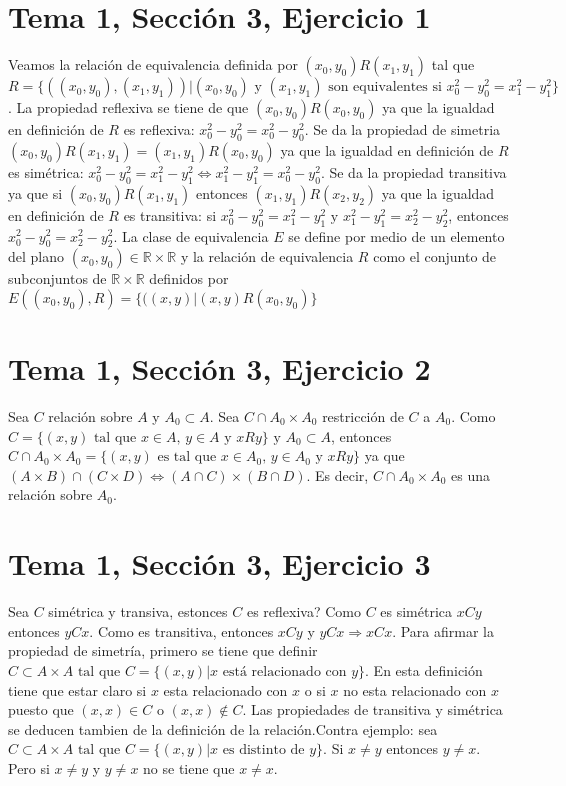 \documentclass{article}
\begin{document}
\section{Tema 1, Sección 3, Ejercicio 1}

Veamos la relación de equivalencia definida por \((x_0,y_0)R(x_1,y_1)\) tal que
\(R=\{((x_0,y_0),(x_1,y_1))| (x_0,y_0) \text{ y } (x_1,y_1) \text{ son equivalentes si } x^{2}_{0}-y^{2}_{0}=x^{2}_{1}-y^{2}_{1} \}\). La propiedad reflexiva se tiene de que \((x_0,y_0)R(x_0,y_0)\) ya que la igualdad en definición de \(R\) es reflexiva: \( x^{2}_{0}-y^{2}_{0}=x^{2}_{0}-y^{2}_{0} \). Se da la propiedad de simetria \((x_0,y_0)R(x_1,y_1)=(x_1,y_1)R(x_0,y_0)\) ya que la igualdad en definición de \(R\) es simétrica: \( x^{2}_{0}-y^{2}_{0}=x^{2}_{1}-y^{2}_{1} \Leftrightarrow  x^{2}_{1}-y^{2}_{1}=x^{2}_{0}-y^{2}_{0} \). Se da la propiedad transitiva ya que si \((x_0,y_0)R(x_1,y_1)\) entonces \((x_1,y_1)R(x_2,y_2)\) ya que la igualdad en definición de \(R\) es transitiva: si \( x^{2}_{0}-y^{2}_{0}=x^{2}_{1}-y^{2}_{1} \text{ y } x^{2}_{1}-y^{2}_{1}=x^{2}_{2}-y^{2}_{2} \), entonces \( x^{2}_{0}-y^{2}_{0}=x^{2}_{2}-y^{2}_{2} \).
\newline
La clase de equivalencia \(E\) se define por medio de un elemento del plano \((x_0,y_0) \in \mathbb{R} \times \mathbb{R}\) y la relación de equivalencia \(R\) como el conjunto de subconjuntos de \(\mathbb{R} \times \mathbb{R}\) definidos por \(E((x_0,y_0),R)=\{((x,y)|(x,y)R(x_0,y_0)\}\)

\section{Tema 1, Sección 3, Ejercicio 2}
Sea \(C\) relación sobre \(A\) y \(A_0 \subset A\). Sea \(C\cap A_0 \times A_0\) restricción de \(C\) a \(A_0\). Como \(C=\{(x,y)\text{ tal que } x\in A \text{, } y \in A \text{ y } xRy\} \text{ y } A_0 \subset A\), entonces \(C\cap A_0 \times A_0 =\{(x,y) \text{ es tal que } x\in A_0 \text{, } y \in A_0 \text{ y } xRy\}\) ya que \((A\times B)\cap(C\times D)\Leftrightarrow (A \cap C)\times (B \cap D)\). Es decir, \(C\cap A_0 \times A_0\)  es una relación sobre \(A_0\).
\section{Tema 1, Sección 3, Ejercicio 3}
Sea \(C\) simétrica y transiva, estonces \(C\) es reflexiva?
Como \(C\) es simétrica \(xCy\) entonces \(yCx\). Como es transitiva, entonces \(xCy\) y \(yCx\Rightarrow xCx\). Para afirmar la propiedad de simetría, primero se tiene que definir \(C \subset A\times A \text{ tal que } C = \{(x,y)| x \text{ está relacionado con } y\}\). En esta definición tiene que estar claro si \(x\) esta relacionado con \(x\) o si \(x\) no esta relacionado con \(x\)  puesto que \((x,x)\in C\) o  \((x,x)\notin C\). Las propiedades de transitiva y simétrica se deducen tambien de la definición de la relación.Contra ejemplo: sea  \(C \subset A\times A \text{ tal que } C = \{(x,y)| x \text{ es distinto de } y\}\). Si \(x\neq y\) entonces \(y\neq x\). Pero si  \(x\neq y\) y \(y\neq x\) no se tiene que \(x\neq x\).
\end{document}
